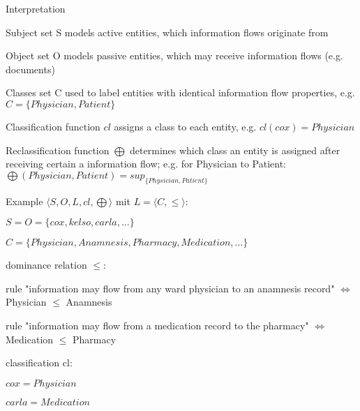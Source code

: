 \documentclass[a4paper]{article}
\begin{document}
\begin{multicols}{3}
    Interpretation
    \begin{itemize*}
        \item Subject set S models active entities, which information flows originate from
        \item Object set O models passive entities, which may receive information flows (e.g. documents)
        \item Classes set C used to label entities with identical information flow properties, e.g. $C=\{Physician,Patient\}$
        \item Classification function $cl$ assigns a class to each entity, e.g. $cl(cox)=Physician$
        \item Reclassification function $\bigoplus$ determines which class an entity is assigned after receiving certain a information flow; e.g. for Physician to Patient: $\bigoplus (Physician,Patient)=sup_{\{Physician,Patient\}}$
    \end{itemize*}

    Example $⟨S,O,L,cl,\bigoplus⟩$ mit $L=⟨C,\leq⟩$:
    \begin{itemize*}
        \item $S=O=\{cox,kelso,carla,...\}$
        \item $C=\{Physician, Anamnesis, Pharmacy, Medication,...\}$
        \item dominance relation $\leq$:
              \begin{itemize*}
                  \item rule "information may flow from any ward physician to an anamnesis record" $\Leftrightarrow$ Physician $\leq$ Anamnesis
                  \item rule "information may flow from a medication record to the pharmacy" $\Leftrightarrow$ Medication $\leq$ Pharmacy
              \end{itemize*}
        \item classification cl:
              \begin{itemize*}
                  \item $cox=Physician$
                  \item $carla=Medication$
              \end{itemize*}
    \end{itemize*}


\end{multicols}
\end{document}
